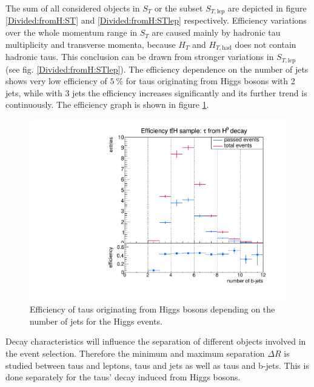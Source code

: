 %
The sum of all considered objects in $S_T$ or the subset $S_{T,\text{lep}}$ are depicted in figure \ref{Divided:fromH:ST} and \ref{Divided:fromH:STlep} respectively. Efficiency variations over the whole momentum range in $S_T$ are caused mainly by hadronic tau multiplicity and transverse momenta, because $H_T$ and $H_{T,\text{had}}$ does not contain hadronic taus. This conclusion can be drawn from stronger variations in $S_{T,\text{lep}}$ (see fig. \ref{Divided:fromH:STlep}).\newline  
The efficiency dependence on the number of jets shows very low efficiency of $\SI{5}{\percent}$ for taus originating from Higgs bosons with 2 jets, while with 3 jets the efficiency increases significantly and its further trend is continuously. The efficiency graph is shown in figure \ref{Divided:fromH:njets}.\newline
%
\begin{figure}
  \centering
                \includegraphics[width=\textwidth]{figures/plots/ttH/Divided_fromHnjets.pdf}
\caption[Efficiency of taus originating from Higgs bosons depending on the number of jets for the Higgs events.]{Efficiency of taus originating from Higgs bosons depending on the number of jets for the Higgs events.}
\label{Divided:fromH:njets}
\end{figure}
%
Decay characteristics will influence the separation of different objects involved in the event selection. Therefore the minimum and maximum separation $\Delta R$ is studied between taus and leptons, taus and jets as well as taus and b-jets. This is done separately for the taus' decay induced from Higgs bosons.\par
